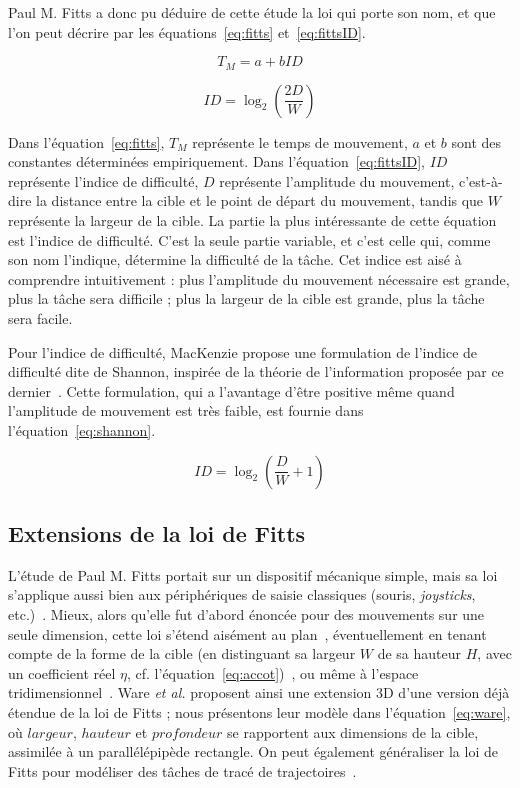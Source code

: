 	Paul M. Fitts a donc pu déduire de cette étude la loi qui porte son nom, et que l'on peut décrire par les équations~\ref{eq:fitts} et~\ref{eq:fittsID}.
	
	\begin{equation}
		\label{eq:fitts}
		T_{M} = a + bID
	\end{equation}
	
	\begin{equation}
		\label{eq:fittsID}
		ID = \log_2\left(\frac{2D}{W} \right)
	\end{equation}
	
	Dans l'équation~\ref{eq:fitts}, $T_{M}$ représente le temps de mouvement, $a$ et $b$ sont des constantes déterminées empiriquement. Dans l'équation~\ref{eq:fittsID}, $ID$ représente l'indice de difficulté, $D$ représente l'amplitude du mouvement, c'est-à-dire la distance entre la cible et le point de départ du mouvement, tandis que $W$ représente la largeur de la cible. La partie la plus intéressante de cette équation est l'indice de difficulté. C'est la seule partie variable, et c'est celle qui, comme son nom l'indique, détermine la difficulté de la tâche. Cet indice est aisé à comprendre intuitivement : plus l'amplitude du mouvement nécessaire est grande, plus la tâche sera difficile ; plus la largeur de la cible est grande, plus la tâche sera facile.
	
	Pour l'indice de difficulté, MacKenzie propose une formulation de l'indice de difficulté dite de Shannon, inspirée de la théorie de l'information proposée par ce dernier~\cite{mackenzie1989note}. Cette formulation, qui a l'avantage d'être positive même quand l'amplitude de mouvement est très faible, est fournie dans l'équation~\ref{eq:shannon}.
	
	\begin{equation}
		\label{eq:shannon}
		ID = \log_2\left(\frac{D}{W} + 1\right)
	\end{equation}
	
	\subsection{Extensions de la loi de Fitts}
	L'étude de Paul M. Fitts portait sur un dispositif mécanique simple, mais sa loi s'applique aussi bien aux périphériques de saisie classiques (souris, \emph{joysticks}, etc.)~\cite{card1978evaluation}. Mieux, alors qu'elle fut d'abord énoncée pour des mouvements sur une seule dimension, cette loi s'étend aisément au plan~\cite{card1978evaluation, mackenzie1992extending}, éventuellement en tenant compte de la forme de la cible (en distinguant sa largeur $W$ de sa hauteur $H$, avec un coefficient réel $\eta$, cf. l'équation~\ref{eq:accot})~\cite{accot2003refining}, ou même à l'espace tridimensionnel~\cite{ware1997selection, murata2001extending}. Ware \emph{et al.} proposent ainsi une extension 3D d'une version déjà étendue de la loi de Fitts ; nous présentons leur modèle dans l'équation~\ref{eq:ware}, où $largeur$, $hauteur$ et $profondeur$ se rapportent aux dimensions de la cible, assimilée à un parallélépipède rectangle. On peut également généraliser la loi de Fitts pour modéliser des tâches de tracé de trajectoires~\cite{accot1997beyond, accot1999performance}.
	
